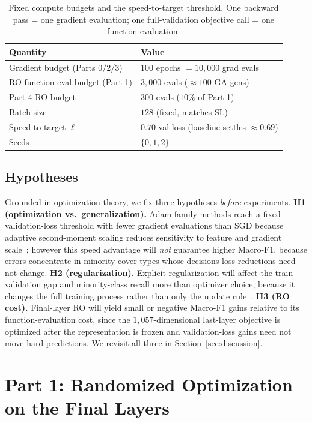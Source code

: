 \documentclass[letterpaper, 10pt, conference]{ieeeconf}
\begin{document}
\begin{table}[t]
\caption{Fixed compute budgets and the speed-to-target threshold. One backward
  pass = one gradient evaluation; one full-validation objective call = one
  function evaluation.}
\label{tab:budget}
\centering\small
\begin{tabular}{@{}ll@{}}
\toprule
Quantity & Value \\
\midrule
Gradient budget (Parts 0/2/3) & $100$ epochs $=10{,}000$ grad evals \\
RO function-eval budget (Part 1) & $3{,}000$ evals ($\approx100$ GA gens) \\
Part-4 RO budget & $300$ evals ($10\%$ of Part 1) \\
Batch size & $128$ (fixed, matches SL) \\
Speed-to-target $\ell$ & $0.70$ val loss (baseline settles $\approx0.69$) \\
Seeds & $\{0,1,2\}$ \\
\bottomrule
\end{tabular}
\end{table}

\subsection{Hypotheses}
\label{sec:hyp}
Grounded in optimization theory, we fix three hypotheses \emph{before}
experiments. \textbf{H1 (optimization vs.\ generalization).} Adam-family methods
reach a fixed validation-loss threshold with fewer gradient evaluations than SGD
because adaptive second-moment scaling reduces sensitivity to feature and
gradient scale~\cite{kingma2015}; however this speed advantage will \emph{not}
guarantee higher Macro-F1, because errors concentrate in minority cover types
whose decisions loss reductions need not change. \textbf{H2 (regularization).}
Explicit regularization will affect the train--validation gap and minority-class
recall more than optimizer choice, because it changes the full training process
rather than only the update rule~\cite{srivastava2014}. \textbf{H3 (RO cost).}
Final-layer RO will yield small or negative Macro-F1 gains relative to its
function-evaluation cost, since the $1{,}057$-dimensional last-layer objective is
optimized after the representation is frozen and validation-loss gains need not
move hard predictions. We revisit all three in Section~\ref{sec:discussion}.

\section{Part 1: Randomized Optimization on the Final Layers}
\label{sec:part1}
\end{document}
